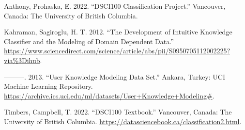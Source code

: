 \documentclass[
  letterpaper,
  DIV=11,
  numbers=noendperiod]{scrartcl}
\newlength{\cslhangindent}
\newenvironment{CSLReferences}[2] %
 {\begin{list}{}{%
  \setlength{\itemindent}{0pt}
  \setlength{\leftmargin}{0pt}
  \setlength{\parsep}{0pt}
  \ifodd #1
   \setlength{\leftmargin}{\cslhangindent}
   \setlength{\itemindent}{-1\cslhangindent}
  \fi
  \setlength{\itemsep}{#2\baselineskip}}}
 {\end{list}}
\begin{document}
\label{refs}
\begin{CSLReferences}{1}{0}
Anthony, Prohaska, E. 2022. {``DSCI100 Classification Project.''}
Vancouver, Canada: The University of British Columbia.

Kahraman, Sagiroglu, H. T. 2012. {``The Development of Intuitive
Knowledge Classifier and the Modeling of Domain Dependent Data.''}
\url{https://www.sciencedirect.com/science/article/abs/pii/S0950705112002225?via\%3Dihub}.

---------. 2013. {``User Knowledge Modeling Data Set.''} Ankara, Turkey:
UCI Machine Learning Repository.
\url{https://archive.ics.uci.edu/ml/datasets/User+Knowledge+Modeling\#}.

Timbers, Campbell, T. 2022. {``DSCI100 Textbook.''} Vancouver, Canada:
The University of British Columbia.
\url{https://datasciencebook.ca/classification2.html}.

\end{CSLReferences}
\end{document}
